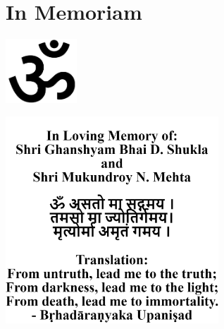 \chapter*{In Memoriam}
\thispagestyle{empty}
\begin{center}
    \includegraphics[width=0.2\textwidth]{Figures/om.png}
\end{center}

\vspace*{\fill}
\noindent
\hspace*{-\oddsidemargin}%
\begin{center}
\includegraphics[width=0.6\textwidth]{Figures/memoriam.png}
\end{center}
\vspace*{\fill}